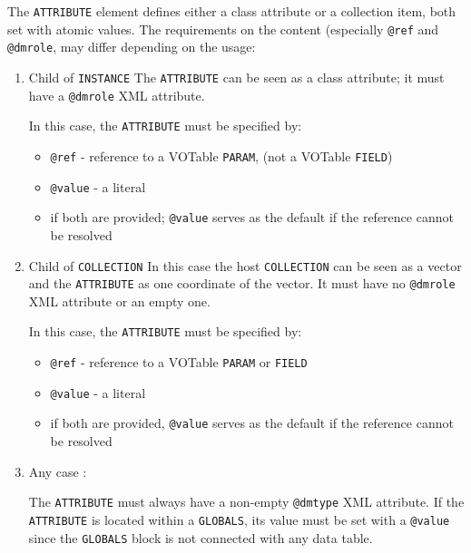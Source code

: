 
The \texttt{ATTRIBUTE} element defines either a class attribute or a collection item, both set with atomic values.
The requirements on
the content (especially \texttt{@ref} and  \texttt{@dmrole}, may differ depending on
the usage:


\begin{enumerate}
\item Child of \texttt{INSTANCE}
 The \texttt{ATTRIBUTE} can be seen as a class attribute;
    it must have a \texttt{@dmrole} XML attribute.

In this case, the \texttt{ATTRIBUTE} must be specified by:
  \begin{itemize} 
      \item \texttt{@ref} - reference to a VOTable \texttt{PARAM}, 
      (not a VOTable \texttt{FIELD})
      \item \texttt{@value} - a literal
      \item  if both are provided; \texttt{@value} serves as the default 
      if the reference cannot be resolved
  \end{itemize}  

  
\item Child of \texttt{COLLECTION} 
In this case the host \texttt{COLLECTION} can be seen as a vector and the \texttt{ATTRIBUTE} as one coordinate of the vector. 
It must have  no \texttt{@dmrole} XML attribute or an empty one.

In this case, the \texttt{ATTRIBUTE} must be specified by:
  \begin{itemize} 
      \item \texttt{@ref} - reference to a VOTable \texttt{PARAM} 
      or \texttt{FIELD}
      \item \texttt{@value} - a literal
      \item if both are provided, \texttt{@value} serves as the default if 
      the reference cannot be resolved
  \end{itemize}  
              
\item Any case :

    The \texttt{ATTRIBUTE} must always have a non-empty \texttt{@dmtype} XML attribute.
    If the \texttt{ATTRIBUTE}  is located within a \texttt{GLOBALS}, its value must be set with  a  \texttt{@value} since the \texttt{GLOBALS} block is not connected with any data table.
\end{enumerate}  
    
